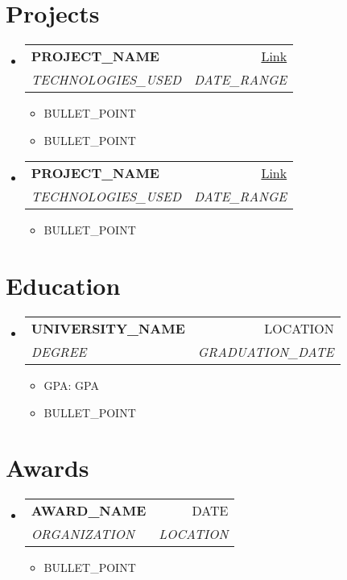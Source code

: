 \documentclass[letterpaper,10pt]{article}
\makeatletter
\newcommand{\resumeItem}[1]{
  \item\small{#1}
}
\newcommand{\resumeSubheading}[4]{
  \vspace{1pt}
  \item
    \begin{tabular*}{0.97\textwidth}[t]{l@{\extracolsep{\fill}}r}
      \textbf{#1} & #2 \\
      \textit{#3} & \textit{#4} \\
    \end{tabular*}\vspace{1pt}
}
\makeatother
\begin{document}
\section{Projects}
\begin{itemize}[leftmargin=0.15in, label={}]
    \resumeSubheading
      {PROJECT\_NAME}{\href{PROJECT\_LINK}{Link}}
      {TECHNOLOGIES\_USED}{DATE\_RANGE}
      \begin{itemize}[leftmargin=0.15in, label=\textbullet]
        \resumeItem{BULLET\_POINT}
        \resumeItem{BULLET\_POINT}
      \end{itemize}
    
    \resumeSubheading
      {PROJECT\_NAME}{\href{PROJECT\_LINK}{Link}}
      {TECHNOLOGIES\_USED}{DATE\_RANGE}
      \begin{itemize}[leftmargin=0.15in, label=\textbullet]
        \resumeItem{BULLET\_POINT}
      \end{itemize}
\end{itemize}

\section{Education}
\begin{itemize}[leftmargin=0.15in, label={}]
    \resumeSubheading
      {UNIVERSITY\_NAME}{LOCATION}
      {DEGREE}{GRADUATION\_DATE}
      \begin{itemize}[leftmargin=0.15in, label=\textbullet]
        \resumeItem{GPA: {GPA}}
        \resumeItem{BULLET\_POINT}
      \end{itemize}
\end{itemize}

\section{Awards}
\begin{itemize}[leftmargin=0.15in, label={}]
    \resumeSubheading
      {AWARD\_NAME}{DATE}
      {ORGANIZATION}{LOCATION}
      \begin{itemize}[leftmargin=0.15in, label=\textbullet]
        \resumeItem{BULLET\_POINT}
      \end{itemize}
\end{itemize}
\end{document}
